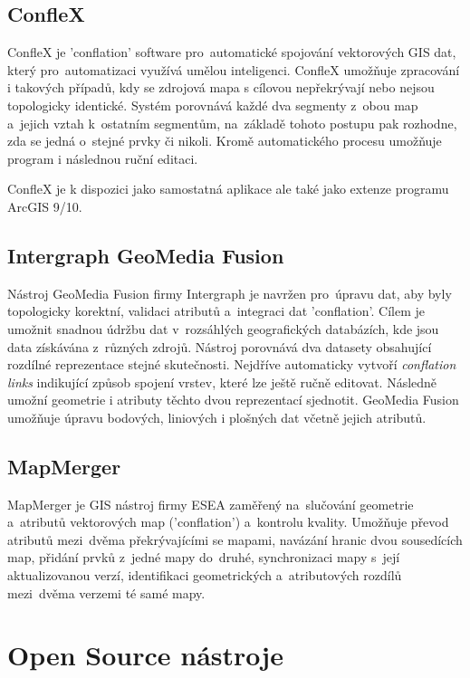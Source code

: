 \subsection{ConfleX}

ConfleX je 'conflation' software pro~automatické spojování vektorových GIS dat, který pro~automatizaci využívá umělou inteligenci. ConfleX umožňuje zpracování i takových 
případů, kdy se zdrojová mapa s cílovou nepřekrývají nebo nejsou topologicky identické. Systém porovnává každé dva segmenty z~obou map a~jejich vztah k~ostatním segmentům, 
na~základě tohoto postupu pak rozhodne, zda se jedná o~stejné prvky či nikoli. Kromě automatického procesu umožňuje program i následnou ruční editaci.

ConfleX je k dispozici jako samostatná aplikace ale také jako extenze programu ArcGIS 9/10.

\subsection{Intergraph GeoMedia Fusion}

Nástroj GeoMedia Fusion firmy Intergraph je navržen pro~úpravu dat, aby byly topologicky korektní, validaci atributů a~integraci dat 'conflation'. Cílem je umožnit snadnou 
údržbu dat v~rozsáhlých geografických databázích, kde jsou data získávána z~různých zdrojů. Nástroj porovnává dva datasety obsahující rozdílné reprezentace stejné skutečnosti.
Nejdříve automaticky vytvoří \textit{conflation links} indikující způsob spojení vrstev, které lze ještě ručně editovat. Následně umožní geometrie i atributy těchto dvou 
reprezentací sjednotit. GeoMedia Fusion umožňuje úpravu bodových, liniových i plošných dat včetně jejich atributů.


\subsection{MapMerger}

MapMerger je GIS nástroj firmy ESEA zaměřený na~slučování geometrie a~atributů vektorových map ('conflation') a~kontrolu kvality. Umožňuje převod atributů 
mezi~dvěma překrývajícími se mapami, navázání hranic dvou sousedících map, přidání prvků z~jedné mapy do~druhé, synchronizaci mapy s~její aktualizovanou verzí, 
identifikaci geometrických a~atributových rozdílů mezi~dvěma verzemi té samé mapy. 

\section{Open Source nástroje}
\label{open-source}

